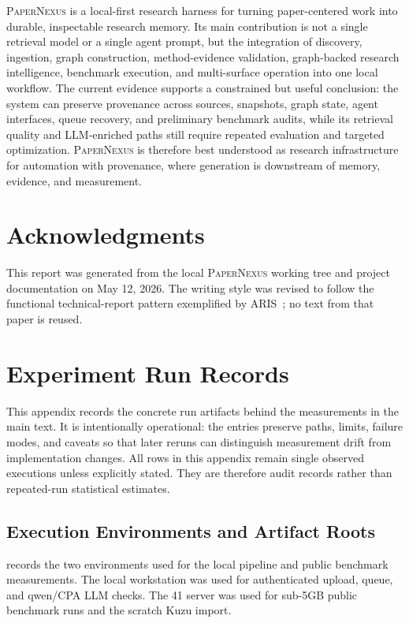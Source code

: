 \documentclass[11pt]{article}
\newcommand{\papernexus}{\textsc{PaperNexus}}
\begin{document}
\papernexus{} is a local-first research harness for turning paper-centered work into durable, inspectable research memory. Its main contribution is not a single retrieval model or a single agent prompt, but the integration of discovery, ingestion, graph construction, method-evidence validation, graph-backed research intelligence, benchmark execution, and multi-surface operation into one local workflow. The current evidence supports a constrained but useful conclusion: the system can preserve provenance across sources, snapshots, graph state, agent interfaces, queue recovery, and preliminary benchmark audits, while its retrieval quality and LLM-enriched paths still require repeated evaluation and targeted optimization. \papernexus{} is therefore best understood as research infrastructure for automation with provenance, where generation is downstream of memory, evidence, and measurement.

\section*{Acknowledgments}

This report was generated from the local \papernexus{} working tree and project documentation on May 12, 2026. The writing style was revised to follow the functional technical-report pattern exemplified by ARIS~\citep{yang2026aris}; no text from that paper is reused.




\appendix

\section{Experiment Run Records}

This appendix records the concrete run artifacts behind the measurements in the main text. It is intentionally operational: the entries preserve paths, limits, failure modes, and caveats so that later reruns can distinguish measurement drift from implementation changes. All rows in this appendix remain single observed executions unless explicitly stated. They are therefore audit records rather than repeated-run statistical estimates.

\subsection{Execution Environments and Artifact Roots}

 records the two environments used for the local pipeline and public benchmark measurements. The local workstation was used for authenticated upload, queue, and qwen/CPA LLM checks. The 41 server was used for sub-5GB public benchmark runs and the scratch Kuzu import.
\end{document}
